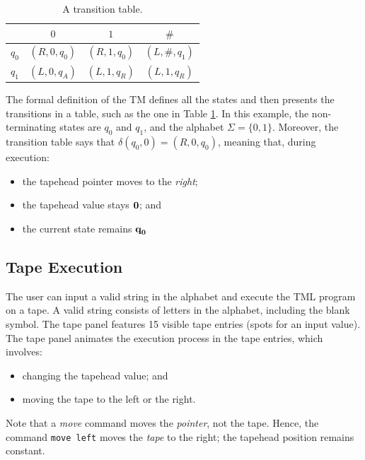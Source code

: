 \begin{table}[htb]
    \centering
    \begin{tabular}{c|ccc}
        & $0$ & $1$ & $\#$ \\
        \hline
        $q_0$ & $(R, 0, q_0)$ & $(R, 1, q_0)$ & $(L, \#, q_1)$ \\
        $q_1$ & $(L, 0, q_A)$ & $(L, 1, q_R)$ & $(L, 1, q_R)$ 
    \end{tabular}
    \caption{A transition table.}
    \label{tbl:table_isDiv2}
\end{table}

The formal definition of the TM defines all the states and then presents the transitions in a table, such as the one in Table \ref{tbl:table_isDiv2}. In this example, the non-terminating states are $q_0$ and $q_1$, and the alphabet $\Sigma = \{0, 1\}$. Moreover, the transition table says that $\delta(q_0, 0) = (R, 0, q_0)$, meaning that, during execution:
\begin{itemize}
    \item the tapehead pointer moves to the \emph{right};
    \item the tapehead value stays $\emph{0}$; and 
    \item the current state remains $\emph{q}_\emph{0}$
\end{itemize}

\subsection{Tape Execution}
The user can input a valid string in the alphabet and execute the TML program on a tape. A valid string consists of letters in the alphabet, including the blank symbol. The tape panel features 15 visible tape entries (spots for an input value). The tape panel animates the execution process in the tape entries, which involves:
\begin{itemize}
    \item changing the tapehead value; and
    \item moving the tape to the left or the right.
\end{itemize}
Note that a \textit{move} command moves the \textit{pointer}, not the tape. Hence, the command \texttt{move left} moves the \textit{tape} to the right; the tapehead position remains constant.

